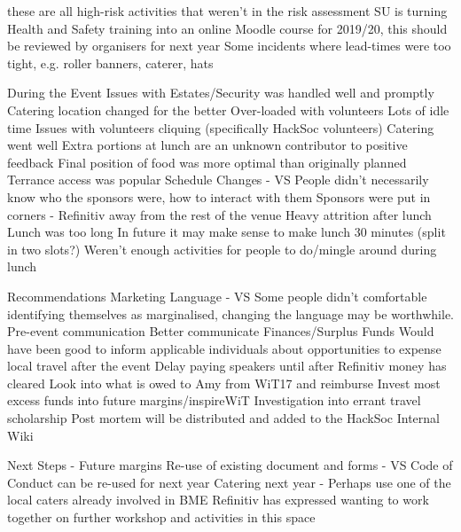 \documentclass[11pt]{meetingmins}
\begin{document}
\begin{items}
			 these are all high-risk activities that weren't in the risk assessment
			\subsubitem SU is turning Health and Safety training into an online Moodle course for 2019/20, this should be reviewed by organisers for next year
		\subitem Some incidents where lead-times were too tight, e.g. roller banners, caterer, hats
	\item During the Event
		\subitem Issues with Estates/Security was handled well and promptly
			\subsubitem Catering location changed for the better
		\subitem Over-loaded with volunteers
			\subsubitem Lots of idle time
			\subsubitem Issues with volunteers cliquing (specifically HackSoc volunteers)
		\subitem Catering went well
			\subsubitem Extra portions at lunch are an unknown contributor to positive feedback
			\subsubitem Final position of food was more optimal than originally planned
		\subitem Terrance access was popular
		\subitem Schedule Changes - VS
		\subitem People didn't necessarily know who the sponsors were, how to interact with them
			\subsubitem Sponsors were put in corners - Refinitiv away from the rest of the venue
		\subitem Heavy attrition after lunch
			\subsubitem Lunch was too long
			\subsubitem In future it may make sense to make lunch 30 minutes (split in two slots?)
			\subsubitem Weren't enough activities for people to do/mingle around during lunch
	\item Recommendations
		\subitem Marketing Language - VS
			\subsubitem Some people didn't comfortable identifying themselves as marginalised, changing the language may be worthwhile.
		\subitem Pre-event communication
			\subsubitem Better communicate 
		\subitem Finances/Surplus Funds
			\subsubitem Would have been good to inform applicable individuals about opportunities to expense local travel after the event
			\subsubitem Delay paying speakers until after Refinitiv money has cleared
			\subsubitem Look into what is owed to Amy from WiT17 and reimburse
			\subsubitem Invest most excess funds into future margins/inspireWiT
		\subitem Investigation into errant travel scholarship
			\subsubitem Post mortem will be distributed and added to the HackSoc Internal Wiki
	\item Next Steps - Future margins
		\subitem Re-use of existing document and forms - VS
			\subsubitem Code of Conduct can be re-used for next year
		\subitem Catering next year - Perhaps use one of the local caters already involved in BME
		\subitem Refinitiv has expressed wanting to work together on further workshop and activities in this space

\end{items}
\end{document}
